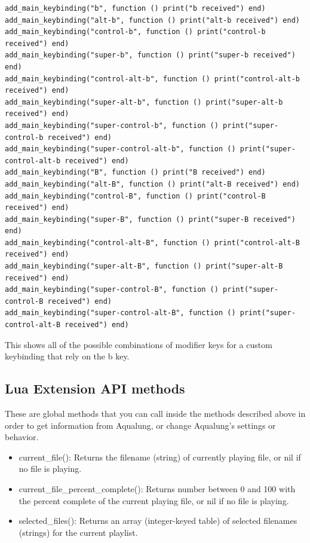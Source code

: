 \documentclass[10pt,english]{article}
\begin{document}
\begin{verbatim}
add_main_keybinding("b", function () print("b received") end)
add_main_keybinding("alt-b", function () print("alt-b received") end)
add_main_keybinding("control-b", function () print("control-b received") end)
add_main_keybinding("super-b", function () print("super-b received") end)
add_main_keybinding("control-alt-b", function () print("control-alt-b received") end)
add_main_keybinding("super-alt-b", function () print("super-alt-b received") end)
add_main_keybinding("super-control-b", function () print("super-control-b received") end)
add_main_keybinding("super-control-alt-b", function () print("super-control-alt-b received") end)
add_main_keybinding("B", function () print("B received") end)
add_main_keybinding("alt-B", function () print("alt-B received") end)
add_main_keybinding("control-B", function () print("control-B received") end)
add_main_keybinding("super-B", function () print("super-B received") end)
add_main_keybinding("control-alt-B", function () print("control-alt-B received") end)
add_main_keybinding("super-alt-B", function () print("super-alt-B received") end)
add_main_keybinding("super-control-B", function () print("super-control-B received") end)
add_main_keybinding("super-control-alt-B", function () print("super-control-alt-B received") end)

\end{verbatim}



\noindent This shows all of the possible combinations of modifier keys for
a custom keybinding that rely on the b key.






\subsection{Lua Extension API methods\label{idp2035712}}



\noindent These are global methods that you can call inside
the methods described above in order to get information
from Aqualung, or change Aqualung's settings or behavior.


\begin{itemize}
\item current\_file(): Returns the filename (string) of currently playing file, or nil if no file is playing.
\item current\_file\_percent\_complete(): Returns number between 0 and 100 with the percent complete of the current
playing file, or nil if no file is playing.
\item selected\_files(): Returns an array (integer-keyed table) of selected filenames (strings) for the current playlist.
\end{itemize}
\end{document}
